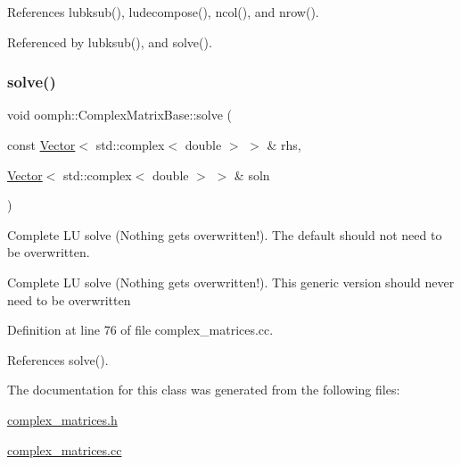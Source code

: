 References lubksub(), ludecompose(), ncol(), and nrow().



Referenced by lubksub(), and solve().

\mbox{\label{classoomph_1_1ComplexMatrixBase_a223cef84c48a2aa9fb387ed4ffaaf48a}} 
\subsubsection{\texorpdfstring{solve()}{solve()}\hspace{0.1cm}{\footnotesize\ttfamily [2/2]}}
{\footnotesize\ttfamily void oomph\+::\+Complex\+Matrix\+Base\+::solve (\begin{DoxyParamCaption}\item[{const \hyperlink{classoomph_1_1Vector}{Vector}$<$ std\+::complex$<$ double $>$ $>$ \&}]{rhs,  }\item[{\hyperlink{classoomph_1_1Vector}{Vector}$<$ std\+::complex$<$ double $>$ $>$ \&}]{soln }\end{DoxyParamCaption})\hspace{0.3cm}{\ttfamily [virtual]}}



Complete LU solve (Nothing gets overwritten!). The default should not need to be overwritten. 

Complete LU solve (Nothing gets overwritten!). This generic version should never need to be overwritten 

Definition at line 76 of file complex\+\_\+matrices.\+cc.



References solve().



The documentation for this class was generated from the following files\+:\begin{DoxyCompactItemize}
\item 
\hyperlink{complex__matrices_8h}{complex\+\_\+matrices.\+h}\item 
\hyperlink{complex__matrices_8cc}{complex\+\_\+matrices.\+cc}\end{DoxyCompactItemize}
